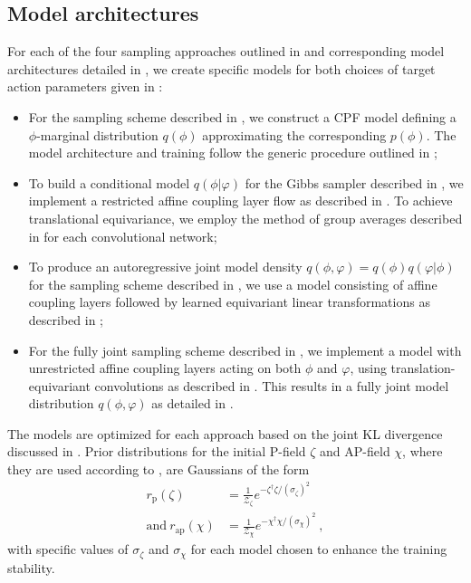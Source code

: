 \documentclass[aps,prd,twocolumn,nofootinbib,superscriptaddress,preprintnumbers]{revtex4-1}
\begin{document}
\subsection{Model architectures}
\label{sec:model-archs}

For each of the four sampling approaches outlined in  and corresponding model architectures detailed in , we create specific models for both choices of target action parameters given in :
%
\begin{itemize}
    \setlength\itemsep{1ex}
    \item For the sampling scheme described in , we construct a CPF model defining a $\phi$-marginal distribution $q(\phi)$ approximating the corresponding $p(\phi)$. The model architecture and training follow the generic procedure outlined in ;
    \item To build a conditional model $q(\phi|\varphi)$ for the Gibbs sampler described in , we implement a restricted affine coupling layer flow as described in . To achieve translational equivariance, we employ the method of group averages described in  for each convolutional network;
    \item To produce an autoregressive joint model density $q(\phi,\varphi) = q(\phi)q(\varphi|\phi)$ for the sampling scheme described in , we use a model consisting of affine coupling layers followed by learned equivariant linear transformations as described in ;
    \item For the fully joint sampling scheme described in , we implement a model with unrestricted affine coupling layers acting on both $\phi$ and $\varphi$, using translation-equivariant convolutions as described in . This results in a fully joint model distribution $q(\phi,\varphi)$ as detailed in .
\end{itemize}
%
The models are optimized for each approach based on the joint KL divergence discussed in . Prior distributions for the initial P-field $\zeta$ and AP-field $\chi$, where they are used according to , are Gaussians of the form
%
\begin{equation}
\begin{aligned}
    r_{\mathrm{p}}(\zeta) &= \frac{1}{\mathcal {Z_{\zeta}}} e^{-\zeta^{\dagger} \zeta / (\sigma_{\zeta})^2 } \\
    \mathrm{and}\ r_{\mathrm{ap}}(\chi) &= \frac{1}{\mathcal {Z_{\chi}}} e^{-\chi^{\dagger} \chi / (\sigma_{\chi})^2}\ ,
\end{aligned}
\end{equation}
%
with specific values of $\sigma_{\zeta}$ and $\sigma_{\chi}$ for each model chosen to enhance the training stability.
\end{document}
